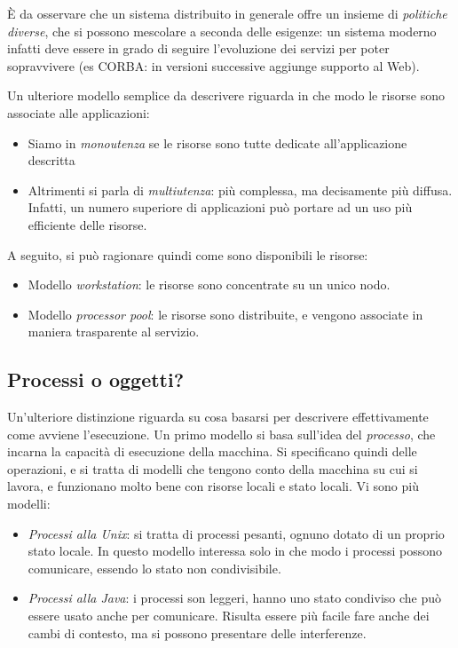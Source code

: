 È da osservare che un sistema distribuito in generale offre un insieme di \textit{politiche diverse}, che si possono
mescolare a seconda delle esigenze: un sistema moderno infatti deve essere in grado di seguire l'evoluzione dei servizi
per poter sopravvivere (es CORBA: in versioni successive aggiunge supporto al Web).

Un ulteriore modello semplice da descrivere riguarda in che modo le risorse
sono associate alle applicazioni:
\begin{itemize}
 \item Siamo in \textit{monoutenza} se le risorse sono tutte dedicate all'applicazione descritta
 \item Altrimenti si parla di \textit{multiutenza}: più complessa, ma decisamente più diffusa. Infatti, un numero
superiore di applicazioni può portare ad un uso più efficiente delle risorse.
\end{itemize}
A seguito, si può ragionare quindi come sono disponibili le risorse:
\begin{itemize}
 \item Modello \textit{workstation}: le risorse sono concentrate su un unico nodo.
 \item Modello \textit{processor pool}: le risorse sono distribuite, e vengono associate in maniera trasparente al
servizio.
\end{itemize}

\subsection{Processi o oggetti?}
Un'ulteriore distinzione riguarda su cosa basarsi per descrivere effettivamente come avviene l'esecuzione.
Un primo modello si basa sull'idea del \textit{processo}, che incarna la capacità di esecuzione della macchina. Si
specificano quindi delle operazioni, e si tratta di modelli che tengono conto della macchina su cui si lavora, e
funzionano molto
bene con risorse locali e stato locali. Vi sono più modelli:
\begin{itemize}
 \item \textit{Processi alla Unix}: si tratta di processi pesanti, ognuno dotato
di un proprio stato locale. In questo modello
interessa solo in che modo i processi possono comunicare, essendo lo stato non
condivisibile.
 \item \textit{Processi alla Java}: i processi son leggeri, hanno uno stato
condiviso che può essere usato anche per comunicare.
Risulta essere più facile fare anche dei cambi di contesto, ma si possono
presentare delle interferenze.
\end{itemize}

